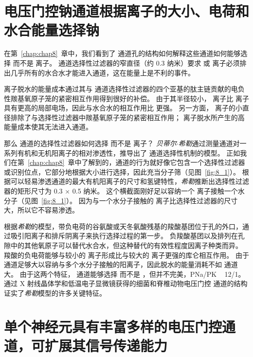 \section{电压门控钠通道根据离子的大小、电荷和水合能量选择钠}

在第~\ref{chap:chap8}~章中，我们看到了  通道孔的结构如何解释这些通道如何能够选择  而不是  离子。
 通道选择性过滤器的窄直径（约 0.3 纳米）要求  或  离子必须排出几乎所有的水合水才能进入通道，这在能量上是不利的事件。


 离子脱水的能量成本通过其与  通道选择性过滤器的四个亚基的肽主链贡献的电负性羰基氧原子笼的紧密相互作用得到很好的补偿。
由于其半径较小， 离子比  离子具有更高的局部电场，因此与水合水的相互作用比  更强。
另一方面， 离子的小直径排除了与选择性过滤器中羰基氧原子笼的紧密相互作用；
 离子脱水所产生的高能量成本使其无法进入通道。


那么  通道的选择性过滤器如何选择  而不是  离子？
\textit{贝蒂尔$\cdot$希勒}通过测量通道对一系列有机和无机阳离子的相对渗透性，推导出了  通道选择性机制的模型。
正如我们在第~\ref{chap:chap8}~章中了解到的，通道的行为就好像它包含一个选择性过滤器或识别位点，它部分地根据大小进行选择，因此充当分子筛（见图~\ref{fig:8_1}）。
根据可以轻易渗透通道的最大有机阳离子的尺寸和氢键特性，\textit{希勒}推断出选择性过滤器的矩形尺寸为 0.3 × 0.5 纳米。
这个横截面刚好足以容纳一个  离子接触一个水分子（见图~\ref{fig:8_1}）。
因为与一个水分子接触的  离子比选择性过滤器的尺寸大，所以它不容易渗透。


根据\textit{希勒}的模型，带负电荷的谷氨酸或天冬氨酸残基的羧酸基团位于孔的外口，通过吸引阳离子和排斥阴离子来执行选择过程的第一步。
负羧酸基团以及排列在孔隙中的其他氧原子可以替代水合水，但这种替代的有效性程度因离子种类而异。
羧酸的负电荷能够与较小的  离子形成比与较大的  离子更强的库仑相互作用。
由于  通道足够大以容纳与多个水分子接触的阳离子，因此脱水的能量消耗不如  通道大。
由于这两个特征， 通道能够选择  而不是 ，但并不完美，PNa/PK ~ 12/1。
通过 X 射线晶体学和低温电子显微镜获得的细菌和脊椎动物电压门控  通道的结构证实了\textit{希勒}模型的许多关键特征。



\section{单个神经元具有丰富多样的电压门控通道，可扩展其信号传递能力}

